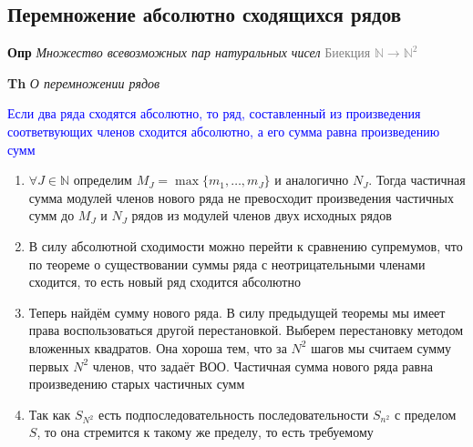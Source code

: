 \subsection{Перемножение абсолютно сходящихся рядов}

\textbf{Опр} \textit{Множество всевозможных пар натуральных чисел} \textcolor{gray}{Биекция
    $\mathbb{N} \rightarrow \mathbb{N}^2$}

\textbf{Th} \textit{О перемножении рядов}

\textcolor{blue}{Если два ряда сходятся абсолютно, то ряд, составленный из произведения соответвующих членов
сходится абсолютно, а его сумма равна произведению сумм}

\begin{enumerate}
    \item $\forall J \in \mathbb{N}$ определим $M_J = \max \{m_1, \dots, m_J\}$ и аналогично $N_J$.
    Тогда частичная сумма модулей членов нового ряда не превосходит произведения частичных сумм до $M_J$ и $N_J$
    рядов из модулей членов двух исходных рядов
    \item В силу абсолютной сходимости можно перейти к сравнению супремумов, что по теореме о существовании суммы
    ряда с неотрицательными членами сходится, то есть новый ряд сходится абсолютно
    \item Теперь найдём сумму нового ряда.
    В силу предыдущей теоремы мы имеет права воспользоваться другой перестановкой.
    Выберем перестановку методом вложенных квадратов.
    Она хороша тем, что за $N^2$ шагов мы считаем сумму первых $N^2$ членов, что задаёт ВОО.
    Частичная сумма нового ряда равна произведению старых частичных сумм
    \item Так как $S_{N^2}$ есть подпоследовательность последовательности $S_{n^2}$ с пределом $S$, то она
    стремится к такому же пределу, то есть требуемому
\end{enumerate}